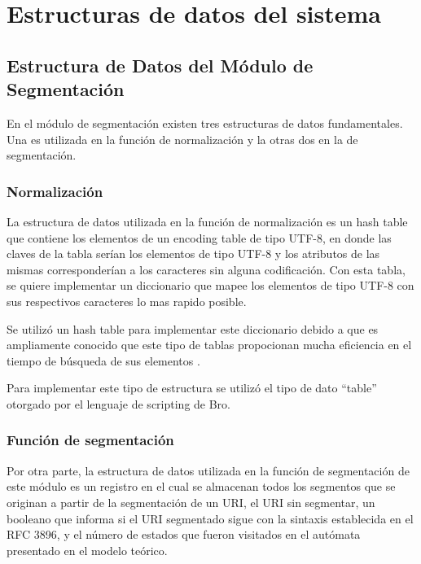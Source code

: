 \chapter{Estructuras de datos del sistema}
\label{apendiceA}



\section*{Estructura de Datos del Módulo de Segmentación}

En el módulo de segmentación existen tres estructuras de datos fundamentales. Una es utilizada en la función de normalización y la otras dos en
la de segmentación.

\subsection*{Normalización}
\label{ssec:estructuraNormalizacion}

La estructura de datos utilizada en la función de normalización es un hash table que contiene los elementos de un encoding table de tipo UTF-8, en donde las claves de la tabla serían los elementos de tipo UTF-8 y los atributos de las mismas corresponderían a los caracteres sin alguna codificación. Con esta tabla, se quiere implementar un diccionario que mapee los elementos de tipo UTF-8 con sus respectivos caracteres lo mas rapido posible.

Se utilizó un hash table para implementar este diccionario debido a que es ampliamente conocido que este tipo de tablas propocionan mucha eficiencia en el tiempo de búsqueda de sus elementos \cite{Cormen}.

Para implementar este tipo de estructura se utilizó el tipo de dato ``table'' otorgado por el lenguaje de scripting de Bro.

\subsection*{Función de segmentación}
\label{ssec:estructuraSegmentacion}

Por otra parte, la estructura de datos utilizada en la función de segmentación de este módulo es un registro en el cual se almacenan todos los segmentos que se originan a partir de la segmentación de un URI, el URI sin segmentar, un booleano que informa si el URI segmentado sigue con la sintaxis establecida en el RFC 3896, y el número de estados que fueron visitados en el autómata presentado en el modelo teórico.
 
